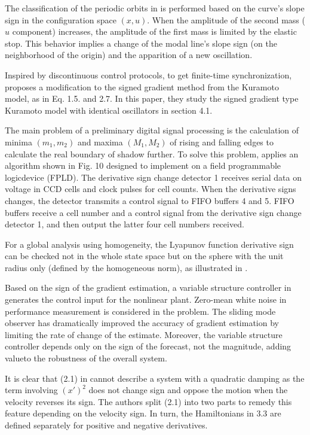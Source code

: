 \documentclass[11pt]{book}
\begin{document}
The classification of the periodic orbits in \cite{moussi2015nonlinear}
is performed based on the curve's slope sign in the configuration
space $\left(x,u\right)$. When the amplitude of the second mass ($u$
component) increases, the amplitude of the first mass is limited by
the elastic stop. This behavior implies a change of the modal line's
slope sign (on the neighborhood of the origin) and the apparition
of a new oscillation.

Inspired by discontinuous control protocols, to get finite-time synchronization,
\cite{dong2015finite} proposes a modification to the signed gradient
method from the Kuramoto model, as in Eq. 1.5. and 2.7. In this paper,
they study the signed gradient type Kuramoto model with identical
oscillators in section 4.1.

The main problem of a preliminary digital signal processing is the
calculation of minima $\left(m_{1},m_{2}\right)$ and maxima $\left(M_{1},M_{2}\right)$
of rising and falling edges to calculate the real boundary of shadow
further. To solve this problem, \cite{chursin2015methods} applies
an algorithm shown in Fig. 10 designed to implement on a field programmable
logicdevice (FPLD). The derivative sign change detector 1 receives
serial data on voltage in CCD cells and clock pulses for cell counts.
When the derivative signs changes, the detector transmits a control
signal to FIFO buffers 4 and 5. FIFO buffers receive a cell number
and a control signal from the derivative sign change detector 1, and
then output the latter four cell numbers received.

For a global analysis using homogeneity, the Lyapunov function derivative
sign can be checked not in the whole state space but on the sphere
with the unit radius only (defined by the homogeneous norm), as illustrated
in \cite{efimov2016conditions}.

Based on the sign of the gradient estimation, a variable structure
controller in \cite{attallah2017histogram} generates the control
input for the nonlinear plant. Zero-mean white noise in performance
measurement is considered in the problem. The sliding mode observer
has dramatically improved the accuracy of gradient estimation by limiting
the rate of change of the estimate. Moreover, the variable structure
controller depends only on the sign of the forecast, not the magnitude,
adding valueto the robustness of the overall system.

It is clear that (2.1) in \cite{pandey2017chiellini} cannot describe
a system with a quadratic damping as the term involving $\left(x'\right)^{2}$
does not change sign and oppose the motion when the velocity reverses
its sign. The authors split (2.1) into two parts to remedy this feature
depending on the velocity sign. In turn, the Hamiltonians in 3.3 are
defined separately for positive and negative derivatives.
\end{document}
